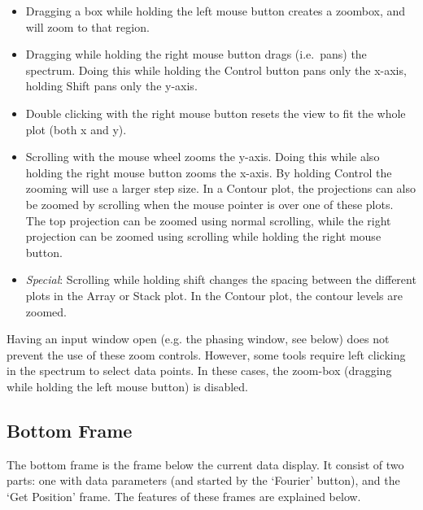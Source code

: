 \documentclass[11pt,a4paper]{article}
\begin{document}
\begin{itemize}
\item Dragging a box while holding the left mouse button creates a zoombox, and will zoom to that region.
\item Dragging while holding the right mouse button drags (i.e.\ pans) the spectrum. Doing this while holding the Control button pans only the x-axis, holding Shift pans only the y-axis.
\item Double clicking with the right mouse button resets the view to fit the whole plot (both x and y).
\item Scrolling with the mouse wheel zooms the y-axis. Doing this while also holding the right mouse button zooms the x-axis. By holding Control the zooming will use a larger step size. In a Contour plot, the projections can also be zoomed by scrolling when the mouse pointer is over one of these plots. The top projection can be zoomed using normal scrolling, while the right projection can be zoomed using scrolling while holding the right mouse button.
\item \textit{Special}: Scrolling while holding shift changes the spacing between the different plots in the Array or Stack plot. In the Contour plot, the contour levels are zoomed.
\end{itemize}

Having an input window open (e.g. the phasing window, see below) does not prevent the use of these zoom controls. However, some tools require left clicking in the spectrum to select data points. In these cases, the zoom-box (dragging while holding the left mouse button) is disabled.

\subsection{Bottom Frame}
The bottom frame is the frame below the current data display. It consist of two parts: one with data parameters (and started by the `Fourier' button), and the `Get Position' frame. The features of these frames are explained below.
\end{document}

